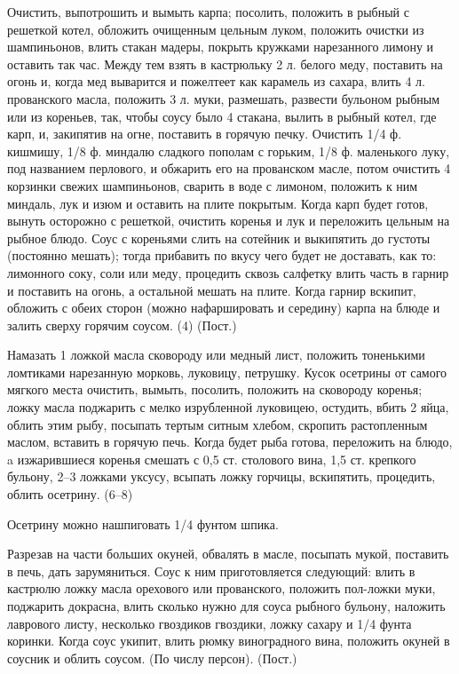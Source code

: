 Очистить, выпотрошить и вымыть карпа; посолить, положить в рыбный с решеткой котел, обложить очищенным цельным луком, положить очистки из шампиньонов, влить стакан мадеры, покрыть кружками нарезанного лимону и оставить так час. Между тем взять в кастрюльку 2 л. белого меду, поставить на огонь и, когда мед выварится и пожелтеет как карамель из сахара, влить 4 л. прованского масла, положить 3 л. муки, размешать, развести бульоном рыбным или из кореньев, так, чтобы соусу было 4 стакана, вылить в рыбный котел, где карп, и, закипятив на огне, поставить в горячую печку. Очистить 1/4 ф. кишмишу, 1/8 ф. миндалю сладкого пополам с горьким, 1/8 ф. маленького луку, под названием перлового, и обжарить его на прованском масле, потом очистить 4 корзинки свежих шампиньонов, сварить в воде с лимоном, положить к ним миндаль, лук и изюм и оставить на плите покрытым. Когда карп будет готов, вынуть осторожно с решеткой, очистить коренья и лук и переложить цельным на рыбное блюдо. Соус с кореньями слить на сотейник и выкипятить до густоты (постоянно мешать); тогда прибавить по вкусу чего будет не доставать, как то: лимонного соку, соли или меду, процедить сквозь салфетку влить часть в гарнир и поставить на огонь, а остальной мешать на плите. Когда гарнир вскипит, обложить с обеих сторон (можно нафаршировать и середину) карпа на блюде и залить сверху горячим соусом. (4) (Пост.) 


Намазать 1 ложкой масла сковороду или медный лист, положить тоненькими ломтиками нарезанную морковь, луковицу, петрушку. Кусок осетрины от самого мягкого места очистить, вымыть, посолить, положить на сковороду коренья; ложку масла поджарить с мелко изрубленной луковицею, остудить, вбить 2 яйца, облить этим рыбу, посыпать тертым ситным хлебом, скропить растопленным маслом, вставить в горячую печь. Когда будет рыба готова, переложить на блюдо, a изжарившиеся коренья смешать с 0,5 ст. столового вина, 1,5 ст. крепкого бульону, 2--3 ложками уксусу, всыпать ложку горчицы, вскипятить, процедить, облить осетрину. (6--8) 

Осетрину можно нашпиговать 1/4 фунтом шпика. 


Разрезав на части больших окуней, обвалять в масле, посыпать мукой, поставить в печь, дать зарумяниться. Соус к ним приготовляется следующий: влить в кастрюлю ложку масла орехового или прованского, положить пол-ложки муки, поджарить докрасна, влить сколько нужно для соуса рыбного бульону, наложить лаврового листу, несколько гвоздиков гвоздики, ложку сахару и 1/4 фунта коринки. Когда соус укипит, влить рюмку виноградного вина, положить окуней в соусник и облить соусом. (По числу персон). (Пост.) 


